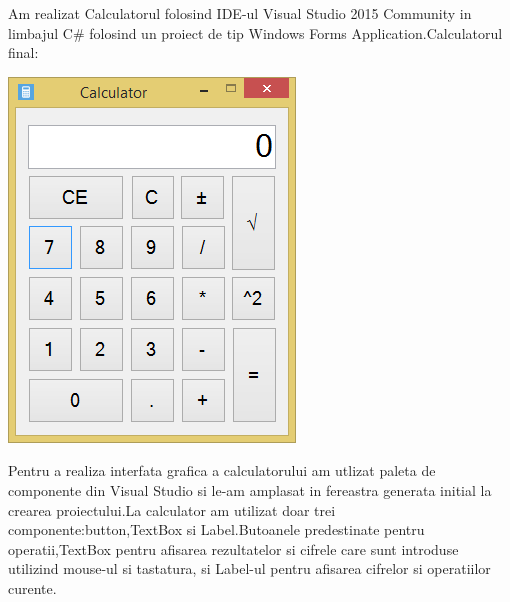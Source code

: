 Am realizat Calculatorul folosind IDE-ul Visual Studio 2015 Community in limbajul \textsc{\large C\#} folosind un proiect de tip Windows Forms Application.Calculatorul final:\\
\begin{center}
\includegraphics[scale=1]{images/Calculator}
\end{center}
Pentru a realiza interfata grafica a calculatorului am utlizat paleta de componente din Visual Studio si le-am amplasat in fereastra generata initial la crearea proiectului.La calculator am utilizat doar trei componente:button,TextBox si Label.Butoanele predestinate pentru operatii,TextBox pentru afisarea rezultatelor si cifrele care sunt introduse utilizind mouse-ul si tastatura, si Label-ul pentru afisarea cifrelor si operatiilor curente.\\
